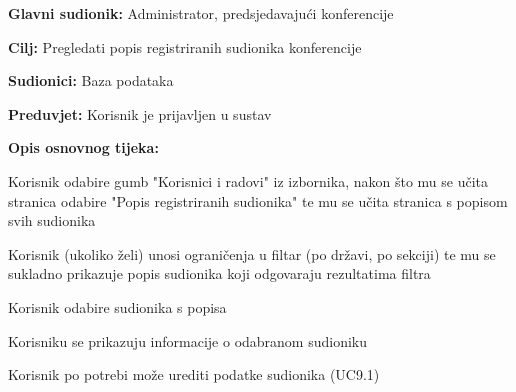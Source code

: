 					\noindent {}
					\begin{packed_item}
						
						\item \textbf{Glavni sudionik: } Administrator, predsjedavajući konferencije
						\item  \textbf{Cilj:} Pregledati popis registriranih sudionika konferencije
						\item  \textbf{Sudionici:} Baza podataka
						\item  \textbf{Preduvjet:} Korisnik je prijavljen u sustav
						\item  \textbf{Opis osnovnog tijeka:}
						
						\item[] \begin{packed_enum}
							
							\item Korisnik odabire gumb "Korisnici i radovi" iz izbornika, nakon što mu se učita stranica odabire "Popis registriranih sudionika" te mu se učita stranica s popisom svih sudionika
							\item Korisnik (ukoliko želi) unosi ograničenja u filtar (po državi, po sekciji) te mu se sukladno prikazuje popis sudionika koji odgovaraju rezultatima filtra
							\item Korisnik odabire sudionika s popisa
							\item Korisniku se prikazuju informacije o odabranom sudioniku
							\item Korisnik po potrebi može urediti podatke sudionika (UC9.1)
							
							
						\end{packed_enum}
						
					\end{packed_item}
					
